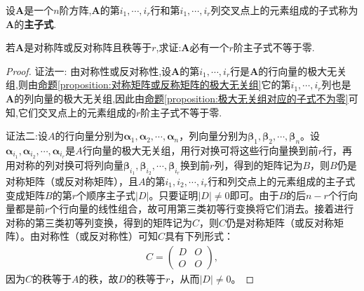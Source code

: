 \documentclass[../../main.tex]{subfiles}%
\begin{document}
\begin{definition}[主子式]
设\(\boldsymbol{A}\)是一个\(n\)阶方阵,\(\boldsymbol{A}\)的第\(i_1,\cdots,i_r\)行和第\(i_1,\cdots,i_r\)列交叉点上的元素组成的子式称为\(\boldsymbol{A}\)的\textbf{主子式}. 
\end{definition}

\begin{proposition}\label{proposition:对称阵或反对称阵必有非零主子式}
若\(\boldsymbol{A}\)是对称阵或反对称阵且秩等于\(r\),求证:\(\boldsymbol{A}\)必有一个\(r\)阶主子式不等于零.
\end{proposition}
\begin{proof}

{\color{blue}证法一:}
由对称性或反对称性,设\(\boldsymbol{A}\)的第\(i_1,\cdots,i_r\)行是\(\boldsymbol{A}\)的行向量的极大无关组,则由\hyperref[proposition:对称矩阵或反称矩阵的极大无关组]{命题\ref{proposition:对称矩阵或反称矩阵的极大无关组}}它的第\(i_1,\cdots,i_r\)列也是\(\boldsymbol{A}\)的列向量的极大无关组,因此由\hyperref[proposition:极大无关组对应的子式不为零]{命题\ref{proposition:极大无关组对应的子式不为零}}可知,它们交叉点上的元素组成的\(r\)阶主子式不等于零. 

{\color{blue}证法二:}设\(A\)的行向量分别为\(\boldsymbol{\alpha}_1,\boldsymbol{\alpha}_2,\cdots,\boldsymbol{\alpha}_n\)，列向量分别为\(\boldsymbol{\beta}_1,\boldsymbol{\beta}_2,\cdots,\boldsymbol{\beta}_n\)。设\(\boldsymbol{\alpha}_{i_1},\boldsymbol{\alpha}_{i_2},\cdots,\boldsymbol{\alpha}_{i_r}\)是\(A\)行向量的极大无关组，用行对换可将这些行向量换到前\(r\)行，再用对称的列对换可将列向量\(\boldsymbol{\beta}_{i_1},\boldsymbol{\beta}_{i_2},\cdots,\boldsymbol{\beta}_{i_r}\)换到前\(r\)列，得到的矩阵记为\(B\)，则\(B\)仍是对称矩阵（或反对称矩阵），且\(A\)的第\(i_1,i_2,\cdots,i_r\)行和列交点上的元素组成的主子式变成矩阵\(B\)的第\(r\)个顺序主子式\(\vert D\vert\)。只要证明\(\vert D\vert\neq 0\)即可。由于\(B\)的后\(n - r\)个行向量都是前\(r\)个行向量的线性组合，故可用第三类初等行变换将它们消去。接着进行对称的第三类初等列变换，得到的矩阵记为\(C\)，则\(C\)仍是对称矩阵（或反对称矩阵）。由对称性（或反对称性）可知\(C\)具有下列形式：
\begin{align*}
C = \begin{pmatrix}
D & O \\
O & O
\end{pmatrix},
\end{align*}
因为\(C\)的秩等于\(A\)的秩，故\(D\)的秩等于\(r\)，从而\(\vert D\vert\neq 0\)。 

\end{proof}
\end{document}
